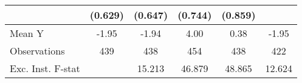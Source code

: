 {\begin{tabular}{l*{5}{c}}
            &     (0.629)         &     (0.647)         &     (0.744)         &     (0.859)         &                     \\
\midrule
Mean Y      &       -1.95         &       -1.94         &        4.00         &        0.38         &       -1.95         \\
Observations&         439         &         438         &         454         &         438         &         422         \\
Exc. Inst. F-stat&                     &      15.213         &      46.879         &      48.865         &      12.624         \\
\bottomrule
\end{tabular}
}
